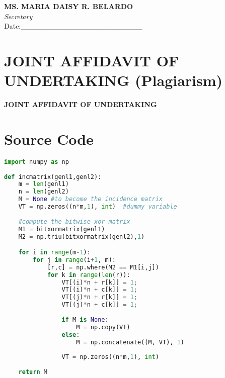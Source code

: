 \begin{theappendices}
\textbf{MS. MARIA DAISY R. BELARDO} \\
\textit{Secretary} \\


Date:\_\_\_\_\_\_\_\_\_\_\_\_\_\_\_\_\_\_\_\_\_\_\_

\chapter{JOINT AFFIDAVIT OF UNDERTAKING (Plagiarism)}

\centering

\textbf{JOINT AFFIDAVIT OF UNDERTAKING}



\chapter{Source Code}

\begin{lstlisting}[language=Python, caption=Python example]
import numpy as np
    
def incmatrix(genl1,genl2):
    m = len(genl1)
    n = len(genl2)
    M = None #to become the incidence matrix
    VT = np.zeros((n*m,1), int)  #dummy variable
    
    #compute the bitwise xor matrix
    M1 = bitxormatrix(genl1)
    M2 = np.triu(bitxormatrix(genl2),1) 

    for i in range(m-1):
        for j in range(i+1, m):
            [r,c] = np.where(M2 == M1[i,j])
            for k in range(len(r)):
                VT[(i)*n + r[k]] = 1;
                VT[(i)*n + c[k]] = 1;
                VT[(j)*n + r[k]] = 1;
                VT[(j)*n + c[k]] = 1;
                
                if M is None:
                    M = np.copy(VT)
                else:
                    M = np.concatenate((M, VT), 1)
                
                VT = np.zeros((n*m,1), int)
    
    return M
\end{lstlisting}


\end{theappendices}